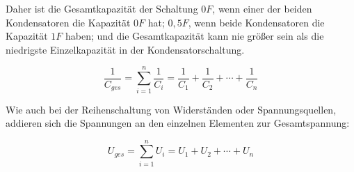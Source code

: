 Daher ist die Gesamtkapazität der Schaltung $0F$, wenn einer der beiden Kondensatoren die Kapazität $0F$ hat; $0,5F$, wenn beide Kondensatoren die Kapazität $1F$ haben; und die Gesamtkapazität kann nie größer sein als die niedrigste Einzelkapazität in der Kondensatorschaltung.

\begin{equation}
	\frac{1}{C_{ges}} = \sum\limits_{i=1}^n \frac{1}{C_i} = \frac{1}{C_1} + \frac{1}{C_2} + \cdots + \frac{1}{C_n}
\end{equation}

\noindent Wie auch bei der Reihenschaltung von Widerständen oder Spannungsquellen, addieren sich die Spannungen an den einzelnen Elementen zur Gesamtspannung:

\begin{equation}
	U_{ges} = \sum\limits_{i=1}^n U_i = U_1 + U_2 + \cdots + U_n
\end{equation}

